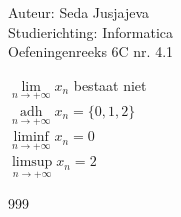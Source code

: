 \documentclass[a4paper]{article}
\newcommand{\limit}{\lim\limits}
\begin{document}
\noindent \large Auteur: Seda Jusjajeva\\
\noindent \large Studierichting: Informatica\\
\noindent \large Oefeningenreeks 6C nr. 4.1\\

\medskip

\normalsize


$\limit_{n \to +\infty} x_n$ bestaat niet\\

$\operatorname*{adh}\limits_{n \to +\infty} x_n = \{0, 1, 2\}$ \\

$\liminf\limits_{n \to +\infty} x_n = 0$ \\

$\limsup\limits_{n \to +\infty} x_n = 2$ \\



\begin{thebibliography}{999}
\end{thebibliography}
\end{document}
